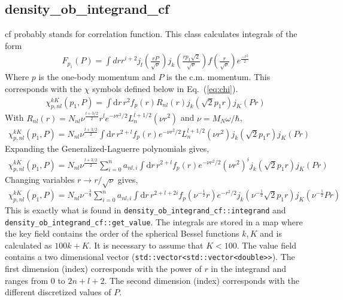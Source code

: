 \documentclass[10pt]{article}
\begin{document}
\subsection{ density\_ob\_integrand\_cf }
cf probably stands for correlation function. This class calculates integrals of 
the form
\begin{align*}
F_{p_1}(P) = \int dr r^{i+2} j_l(\frac{rP}{\sqrt{\nu}})  j_k(\frac{r 
p_1\sqrt{2}}{\sqrt{\nu}} )  f(\frac{r}{\sqrt{\nu}})  e^{\frac{-r^2}{2}}
\end{align*}
Where $p$ is the one-body momentum and $P$ is the c.m. momentum. This 
corresponds with the $\chi$ symbols defined below in Eq.~(\ref{eq:chi}).
\begin{align*}
	\chi_{p,nl}^{kK}(p_1,P) = \int \text{d} r\, r^{2} f_{p}(r) R_{n l}(r) 
j_{k}( \sqrt{2} p_1 r)  j_{K}(P r)
\end{align*}
With  $R_{nl}(r) = N_{nl} \nu^{\frac{l + 3/2}{2}} r^{l} e^{-\nu r^{2} /2} 
L_{n}^{l+1/2}(\nu r^{2})$ and $ \nu = M_N \omega / \hbar $,
\begin{align*}
	\chi_{p,nl}^{kK}(p_1,P) = N_{nl} \nu^{\frac{l + 3/2}{2}} \int \text{d} 
r\, r^{2+l} f_{p}(r)  e^{-\nu r^{2} /2} L_{n}^{l+1/2}(\nu r^{2}) j_{k}( 
\sqrt{2} p_1 r)  j_{K}(P r)
\end{align*}
Expanding the Generalized-Laguerre polynomials gives,
\begin{align*}
	\chi_{p,nl}^{kK}(p_1,P) = N_{nl} \nu^{\frac{l + 3/2}{2}} \sum_{i=0}^{n} 
a_{nl,i} \int \text{d} r\, r^{2+l} f_{p}(r)  e^{-\nu r^{2} /2}  (\nu r^{2})^{i} 
j_{k}( \sqrt{2} p_1 r)  j_{K}(P r)
\end{align*}
Changing variables $ r \rightarrow r/\sqrt{\nu}$ gives,
\begin{align*}
	\chi_{p,nl}^{kK}(p_1,P) =  N_{nl} \nu^{-\frac{3}{4}} \sum_{i=0}^{n} 
a_{nl,i} \int \text{d} r\, r^{2+l+2i} f_{p}( \nu^{-\frac{1}{2}} r)  e^{-r^{2} 
/2} j_{k}( \nu^{-\frac{1}{2}} \sqrt{2} p_1 r)  j_{K}(\nu^{-\frac{1}{2}} P r)
\end{align*}
This is exactly what is found in \texttt{density\_ob\_integrand\_cf::integrand} 
and \\ \texttt{density\_ob\_integrand\_cf::get\_value}.
The integrals are stored in a map where the key field contains the order of the 
spherical Bessel functions $k,K$ and is calculated as $100k+K$. It is necessary 
to assume that $ K < 100$.
The value field contains a two dimensional vector 
(\texttt{std::vector<std::vector<double>>}).
The first dimension (index) corresponds with the power of $r$ in the integrand 
and ranges from $0$ to $2n+l+2$.
The second dimension (index) corresponds with the different discretized values 
of $P$.
\end{document}
